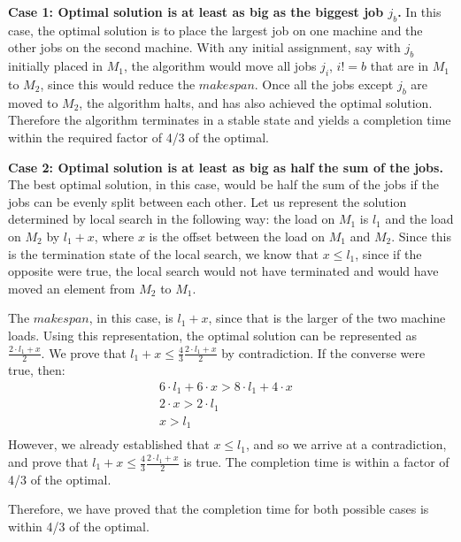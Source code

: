 \documentclass[11pt]{article}
\begin{document}
\textbf{Case 1: Optimal solution is at least as big as the biggest job $j_b$.}
In this case, the optimal solution is to place the largest job on one machine and the other jobs on the second machine. With any initial assignment, say with $j_b$ initially placed in $M_1$, the algorithm would move all jobs $j_i$, $i!=b$ that are in $M_1$ to $M_2$, since this would reduce the $makespan$. Once all the jobs except $j_b$ are moved to $M_2$, the algorithm halts, and has also achieved the optimal solution. Therefore the algorithm terminates in a stable state and yields a completion time within the required factor of 4/3 of the optimal.

\textbf{Case 2: Optimal solution is at least as big as half the sum of the jobs.}
The best optimal solution, in this case, would be half the sum of the jobs if the jobs can be evenly split between each other. Let us represent the solution determined by local search in the following way: the load on $M_1$ is $l_1$ and the load on $M_2$ by $l_1 + x$, where $x$ is the offset between the load on $M_1$ and $M_2$. Since this is the termination state of the local search, we know that $x \leq l_1$, since if the opposite were true, the local search would not have terminated and would have moved an element from $M_2$ to $M_1$.

The $makespan$, in this case, is $l_1 + x$, since that is the larger of the two machine loads. Using this representation, the optimal solution can be represented as $\frac{2 \cdot l_1 + x}{2}$. We prove that $l_1 + x \leq \frac{4}{3}\frac{2 \cdot l_1 + x}{2}$ by contradiction. If the converse were true, then:
\begin{align*}
	6 \cdot l_1 + 6 \cdot x > 8 \cdot l_1 + 4 \cdot x &\\
	2\cdot x > 2 \cdot l_1 & \\
	x > l_1 & \\
\end{align*}
However, we already established that $x \leq l_1$, and so we arrive at a contradiction, and prove that $l_1 + x \leq \frac{4}{3}\frac{2 \cdot l_1 + x}{2}$ is true. The completion time is within a factor of 4/3 of the optimal.

Therefore, we have proved that the completion time for both possible cases is within 4/3 of the optimal.
\end{document}
